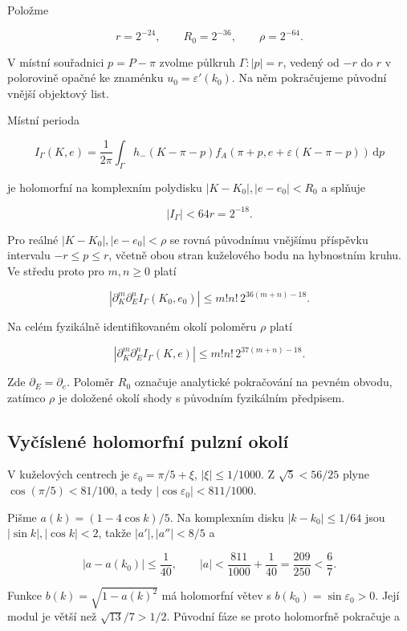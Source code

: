\documentclass[11pt,a4paper]{article}
\theoremstyle{remark}\newtheorem{remark}[theorem]{Poznámka}
\numberwithin{equation}{section}
\begin{document}
Položme

\[
\boxed{r=2^{-24},\qquad R_0=2^{-36},\qquad \rho=2^{-64}.}
\tag{QC2}
\]

V místní souřadnici \(p=P-\pi\) zvolme půlkruh \(\Gamma:|p|=r\), vedený
od \(-r\) do \(r\) v polorovině opačné ke znaménku
\(u_0=\varepsilon'(k_0)\). Na něm pokračujeme původní vnější objektový
list.

Místní perioda

\[
I_\Gamma(K,e)=\frac1{2\pi}\int_\Gamma
h_-(K-\pi-p)
f_A(\pi+p,e+\varepsilon(K-\pi-p))\,\mathrm dp
\tag{QC3}
\]

je holomorfní na komplexním polydisku \(|K-K_0|,|e-e_0|<R_0\) a splňuje

\[
\boxed{|I_\Gamma|<64r=2^{-18}.}
\tag{QC4}
\]

Pro reálné \(|K-K_0|,|e-e_0|<\rho\) se rovná původnímu vnějšímu
příspěvku intervalu \(-r\le p\le r\), včetně obou stran kuželového bodu
na hybnostním kruhu. Ve středu proto pro \(m,n\ge0\) platí

\[
\boxed{
|\partial_K^m\partial_E^n I_\Gamma(K_0,e_0)|
\le m!n!\,2^{36(m+n)-18}.
}
\tag{QC5}
\]

Na celém fyzikálně identifikovaném okolí poloměru \(\rho\) platí

\[
\boxed{
|\partial_K^m\partial_E^n I_\Gamma(K,e)|
\le m!n!\,2^{37(m+n)-18}.
}
\tag{QC6}
\]

Zde \(\partial_E=\partial_e\). Poloměr \(R_0\) označuje analytické
pokračování na pevném obvodu, zatímco \(\rho\) je doložené okolí shody s
původním fyzikálním předpisem.

\hypertarget{vyux10duxedslenuxe9-holomorfnuxed-pulznuxed-okoluxed}{%
\subsection{Vyčíslené holomorfní pulzní
okolí}\label{vyux10duxedslenuxe9-holomorfnuxed-pulznuxed-okoluxed}}

V kuželových centrech je \(\varepsilon_0=\pi/5+\xi\),
\(|\xi|\le1/1000\). Z \(\sqrt5<56/25\) plyne \(\cos(\pi/5)<81/100\), a
tedy \(|\cos\varepsilon_0|<811/1000\).

Pišme \(a(k)=(1-4\cos k)/5\). Na komplexním disku \(|k-k_0|\le1/64\)
jsou \(|\sin k|,|\cos k|<2\), takže \(|a'|,|a''|<8/5\) a

\[
|a-a(k_0)|\le\frac1{40},\qquad
|a|<\frac{811}{1000}+\frac1{40}
=\frac{209}{250}<\frac67.
\tag{QC7}
\]

Funkce \(b(k)=\sqrt{1-a(k)^2}\) má holomorfní větev s
\(b(k_0)=\sin\varepsilon_0>0\). Její modul je větší než
\(\sqrt{13}/7>1/2\). Původní fáze se proto holomorfně pokračuje a
\end{document}
